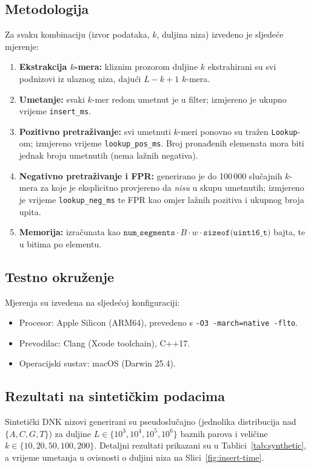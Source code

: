 \documentclass[12pt,a4paper]{article}
\begin{document}
\subsection{Metodologija}
Za svaku kombinaciju (izvor podataka, $k$, duljina niza) izvedeno je sljedeće mjerenje:
\begin{enumerate}
    \item \textbf{Ekstrakcija $k$-mera:} kliznim prozorom duljine $k$ ekstrahirani su
          svi podnizovi iz ulaznog niza, dajući $L - k + 1$ $k$-mera.
    \item \textbf{Umetanje:} svaki $k$-mer redom umetnut je u filter; izmjereno je
          ukupno vrijeme \texttt{insert\_ms}.
    \item \textbf{Pozitivno pretraživanje:} svi umetnuti $k$-meri ponovno su tražen
          \texttt{Lookup}-om; izmjereno vrijeme \texttt{lookup\_pos\_ms}. Broj
          pronađenih elemenata mora biti jednak broju umetnutih (nema lažnih negativa).
    \item \textbf{Negativno pretraživanje i FPR:} generirano je do 100\,000 slučajnih
          $k$-mera za koje je eksplicitno provjereno da \emph{nisu} u skupu umetnutih;
          izmjereno je vrijeme \texttt{lookup\_neg\_ms} te FPR kao omjer lažnih
          pozitiva i ukupnog broja upita.
    \item \textbf{Memorija:} izračunata kao
          $\texttt{num\_segments} \cdot B \cdot w \cdot \texttt{sizeof(uint16\_t)}$
          bajta, te u bitima po elementu.
\end{enumerate}

\subsection{Testno okruženje}
Mjerenja su izvedena na sljedećoj konfiguraciji:
\begin{itemize}
    \item Procesor: Apple Silicon (ARM64), prevedeno s \texttt{-O3 -march=native -flto}.
    \item Prevodilac: Clang (Xcode toolchain), C++17.
    \item Operacijski sustav: macOS (Darwin 25.4).
\end{itemize}

\subsection{Rezultati na sintetičkim podacima}
Sintetički DNK nizovi generirani su pseudoslučajno (jednolika distribucija nad
$\{A, C, G, T\}$) za duljine $L \in \{10^3, 10^4, 10^5, 10^6\}$ baznih parova i
veličine $k \in \{10, 20, 50, 100, 200\}$. Detaljni rezultati prikazani su u
Tablici~\ref{tab:synthetic}, a vrijeme umetanja u ovisnosti o duljini niza na
Slici~\ref{fig:insert-time}.
\end{document}
